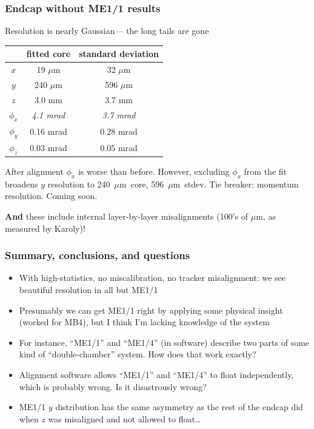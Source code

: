 \documentclass[compress]{beamer}
\begin{document}
\begin{frame}
\frametitle{Endcap without ME1/1 results}

Resolution is nearly Gaussian--- the long tails are gone
\begin{center}
\begin{tabular}{c | c c}
\hline\hline
\mbox{\hspace{1 cm}} & fitted core & standard deviation \\\hline
$x$ & 19 $\mu$m & 32 $\mu$m \\
$y$ & 240 $\mu$m & 596 $\mu$m \\
$z$ & 3.0 mm & 3.7 mm \\\hline
$\phi_x$ & {\it 4.1 mrad} & {\it 3.7 mrad} \\
$\phi_y$ & 0.16 mrad & 0.28 mrad \\
$\phi_z$ & 0.03 mrad & 0.05 mrad \\
\hline\hline
\end{tabular}
\end{center}

\vfill After alignment $\phi_x$ is worse than before.
However, excluding $\phi_x$ from the fit broadens $y$ resolution to
240~$\mu$m~core, 596~$\mu$m~stdev.  Tie breaker: momentum resolution.  Coming soon.

\vfill
{\bf And} these include internal layer-by-layer misalignments (100's of $\mu$m, as measured by Karoly)!
\end{frame}

\begin{frame}
\frametitle{Summary, conclusions, and questions}
\begin{itemize}
\item<1-> With high-statistics, no miscalibration, no tracker misalignment: we
see beautiful resolution in all but ME1/1

\item<1-> Presumably we can get ME1/1 right by applying some physical
insight (worked for MB4), but I think I'm lacking knowledge of the
system

\item<2-> For instance, ``ME1/1'' and ``ME1/4'' (in software) describe two
parts of some kind of ``double-chamber'' system.  How does that work exactly?

\item<2-> Alignment software allows ``ME1/1'' and ``ME1/4'' to
float independently, which is probably wrong.  Is it disastrously
wrong?

\item<3-> ME1/1 $y$ distribution has the same asymmetry as the rest of the
endcap did when $z$ was misaligned and not allowed to float\ldots

\end{itemize}
\label{numpages}
\end{frame}
\end{document}
